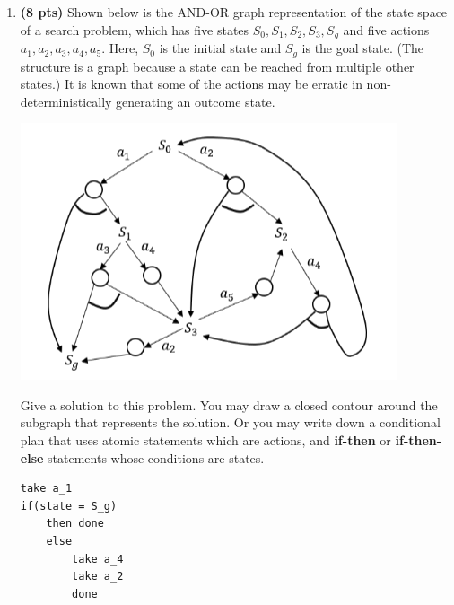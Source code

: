 \documentclass{article}
\begin{document}
\begin{enumerate}


\item \textbf{(8 pts)} Shown below is the AND-OR graph representation of the state space of a search problem, which has five states $S_0, S_1, S_2, S_3, S_g$ and five actions $a_1, a_2, a_3, a_4, a_5$. Here, $S_0$ is the initial state and $S_g$ is the goal state. (The structure is a graph because a state can be reached from multiple other states.) It is known that some of the actions may be erratic in non-deterministically generating an outcome state.

\begin{center}
    \includegraphics[scale=0.75]{472-PS3-Q4.png}
\end{center}

Give a solution to this problem. You may draw a closed contour around the subgraph that represents the solution. Or you may write down a conditional plan that uses atomic statements which are actions, and \textbf{if-then} or \textbf{if-then-else} statements whose conditions are states.

\color{blue}
\begin{lstlisting}
take a_1
if(state = S_g)
    then done
    else
        take a_4
        take a_2
        done
\end{lstlisting}
\color{black}


\end{enumerate}
\end{document}
